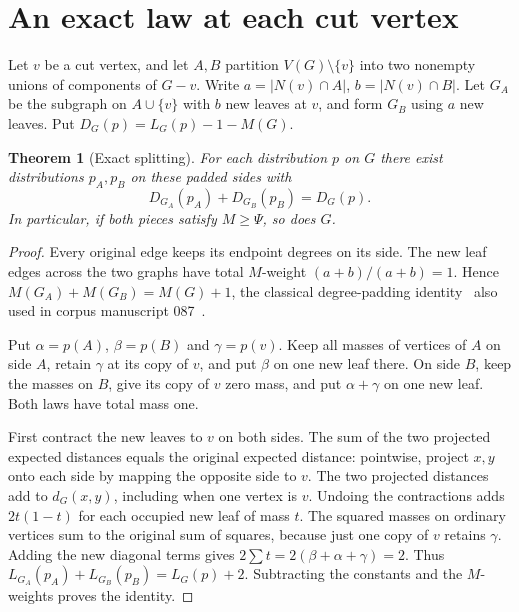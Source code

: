 \documentclass[11pt,a4paper]{article}
\newtheorem{theorem}{Theorem}[section]
\begin{document}
\section{An exact law at each cut vertex}
Let $v$ be a cut vertex, and let $A,B$ partition $V(G)\setminus\{v\}$ into two nonempty unions of components of $G-v$. Write $a=|N(v)\cap A|$, $b=|N(v)\cap B|$. Let $G_A$ be the subgraph on $A\cup\{v\}$ with $b$ new leaves at $v$, and form $G_B$ using $a$ new leaves. Put $D_G(p)=L_G(p)-1-M(G)$.
\begin{theorem}[Exact splitting]\label{p11-thm:split}
For each distribution $p$ on $G$ there exist distributions $p_A,p_B$ on these padded sides with
\[
 D_{G_A}(p_A)+D_{G_B}(p_B)=D_G(p).
\]
In particular, if both pieces satisfy $M\ge\Psi$, so does $G$.
\end{theorem}
\begin{proof}
Every original edge keeps its endpoint degrees on its side. The new leaf edges across the two graphs have total $M$-weight $(a+b)/(a+b)=1$. Hence $M(G_A)+M(G_B)=M(G)+1$, the classical degree-padding identity~\cite[Lemma~4]{p11-DLS} also used in corpus manuscript 087~\cite{p11-VMRC}.

Put $\alpha=p(A)$, $\beta=p(B)$ and $\gamma=p(v)$. Keep all masses of vertices of $A$ on side $A$, retain $\gamma$ at its copy of $v$, and put $\beta$ on one new leaf there. On side $B$, keep the masses on $B$, give its copy of $v$ zero mass, and put $\alpha+\gamma$ on one new leaf. Both laws have total mass one.

First contract the new leaves to $v$ on both sides. The sum of the two projected expected distances equals the original expected distance: pointwise, project $x,y$ onto each side by mapping the opposite side to $v$. The two projected distances add to $d_G(x,y)$, including when one vertex is $v$. Undoing the contractions adds $2t(1-t)$ for each occupied new leaf of mass $t$. The squared masses on ordinary vertices sum to the original sum of squares, because just one copy of $v$ retains $\gamma$. Adding the new diagonal terms gives $2\sum t=2(\beta+\alpha+\gamma)=2$. Thus $L_{G_A}(p_A)+L_{G_B}(p_B)=L_G(p)+2$. Subtracting the constants and the $M$-weights proves the identity.
\end{proof}
\end{document}
